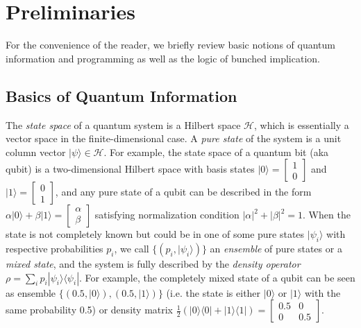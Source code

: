 \documentclass[conference,compsoc, 10pt]{IEEEtran}
\newcommand {\cH } {{\mathcal{H}}}
\newcommand{\sd}{\diamond}%
\def\>{\ensuremath{\rangle}}
\def\<{\ensuremath{\langle}}
\begin{document}
	\section{Preliminaries}
	\label{sec-def}
	For the convenience of the reader, we briefly review basic notions of quantum information and programming as well as the logic of bunched implication.  
	
	\subsection{Basics of Quantum Information}
	\label{sec basic Quantum}
	
  The \emph{state space} of a quantum system is a Hilbert space $\cH$, which is
  essentially a vector space in the finite-dimensional case. A \emph{pure state}
  of the system is a unit column vector $|\psi\>\in\cH$. For example, the state
  space of a quantum bit (aka qubit) is a two-dimensional Hilbert space with
  basis states $|0\> = \left[\begin{array}{c} 1 \\ 0\end{array} \right]$ and
  $|1\> = \left[\begin{array}{c} 0 \\ 1 \end{array}\right]$, and any pure state
  of a qubit can be described in the form $\alpha|0\>+\beta|1\> =
  \left[\begin{array}{c} \alpha \\ \beta \end{array}\right]$ satisfying
  normalization condition $|\alpha|^2+|\beta|^2 = 1$. When the state is not
  completely known but could be in one of some pure states $|\psi_i\>$ with
  respective probabilities $p_i$, we call $\{(p_i,|\psi_i\>)\}$ an
  \emph{ensemble} of pure states or a \emph{mixed state}, and the system is
  fully described by the \emph{density operator} $\rho =
  \sum_ip_i|\psi_i\>\<\psi_i|$. For example, the completely mixed state of a
  qubit can be seen as ensemble $\{(0.5,|0\>), (0.5,|1\>)\}$ (i.e. the state is
  either $|0\>$ or $|1\>$ with the same probability 0.5) or density matrix
  $\frac{1}{2}(|0\>\<0|+|1\>\<1|) = \left[\begin{array}{cc} 0.5 & 0 \\ 0 & 0.5
  \end{array}\right].$
	
\end{document}
